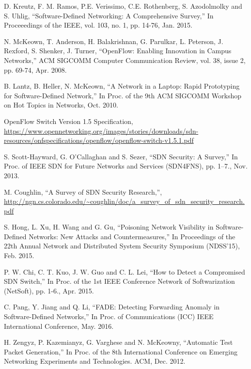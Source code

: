 \begin{thebibliography}{1}

D. Kreutz, F. M. Ramos, P.E. Verissimo, C.E. Rothenberg, S. Azodolmolky and S. Uhlig,
``Software-Defined Networking: A Comprehensive Survey,'' In Proceeedings of the IEEE, vol. 103, no. 1, pp.  14-76, Jan. 2015.

N. McKeown, T. Anderson, H. Balakrishnan, G. Parulkar, L. Peterson, J. Rexford, S. Shenker, J. Turner,
``OpenFlow: Enabling Innovation in Campus Networks,'' ACM SIGCOMM Computer Communication Review, vol. 38, issue 2, pp. 69-74, Apr. 2008.

B. Lantz, B. Heller, N. McKeown,
``A Network in a Laptop: Rapid Prototyping for Software-Defined Network,'' In Proc. of the 9th ACM SIGCOMM Workshop on Hot Topics in Networks, Oct. 2010.

OpenFlow Switch Version 1.5 Specification, \url{https://www.opennetworking.org/images/stories/downloads/sdn-resources/onfspecifications/openflow/openflow-switch-v1.5.1.pdf}

S. Scott-Hayward, G. O’Callaghan and S. Sezer,
``SDN Security: A Survey,'' In Proc. of IEEE SDN for Future Networks and Services (SDN4FNS), pp. 1–7., Nov. 2013.

M. Coughlin,
``A Survey of SDN Security Research,'', \url{http://ngn.cs.colorado.edu/~coughlin/doc/a_survey_of_sdn_security_research.pdf}

S. Hong, L. Xu, H. Wang and G. Gu,
``Poisoning Network Visibility in Software-Defined Networks: New Attacks and Countermeasures,''  In Proceedings of the 22th Annual Network and Distributed System Security Symposium (NDSS’15), Feb. 2015.

P. W. Chi, C. T. Kuo, J. W. Guo and C. L. Lei,
``How to Detect a Compromised SDN Switch,'' In Proc. of the 1st IEEE Conference Network of Softwarization (NetSoft), pp. 1-6., Apr. 2015.

C. Pang, Y. Jiang and Q. Li,
``FADE: Detecting Forwarding Anomaly in Software-Defined Networks,'' In Proc. of Communications (ICC) IEEE International Conference, May. 2016.

H. Zengyz, P. Kazemianyz, G. Varghese and N. McKeowny,
``Automatic Test Packet Generation,'' In Proc. of the 8th International Conference on Emerging Networking Experiments and Technologies. ACM, Dec. 2012.


\end{thebibliography}
